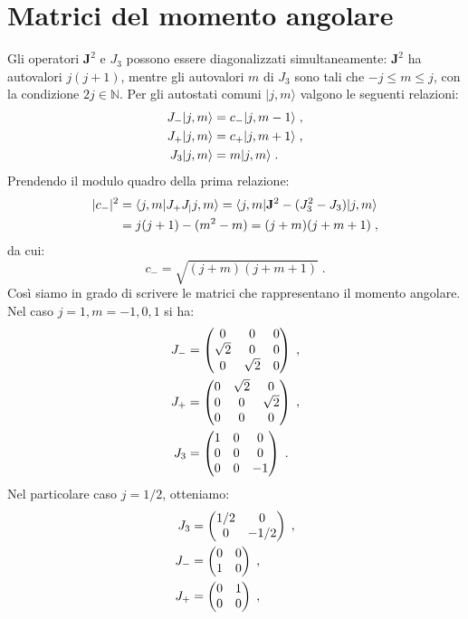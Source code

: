 \documentclass[10pt,a4paper]{report}
\theoremstyle{definition}
\numberwithin{equation}{section}
\newcommand{\bra}{\langle}
\newcommand{\ket}{\rangle}
\begin{document}
\section{Matrici del momento angolare}
Gli operatori $\mathbf{J}^2$ e $J_3$ possono essere diagonalizzati simultaneamente: $\mathbf{J}^2$ ha autovalori $j(j+1)$, mentre gli autovalori $m$ di $J_3$ sono tali che $-j\le m\le j$, con la condizione $2j\in \mathbb{N}$. Per gli autostati comuni $|j,m\ket$ valgono le seguenti relazioni:
\begin{align}
J_-|j,m\ket&=c_-|j,m-1\ket \notag\;, \\
J_+|j,m\ket &= c_+|j,m+1\ket \notag\;, \\
J_3|j,m\ket &= m|j,m\ket\;.
\end{align}
Prendendo il modulo quadro della prima relazione:
\begin{align}
|c_-|^2 &= \bra j,m|J_+J_|j,m\ket = \bra j,m|\mathbf{J}^2-(J_3^2-J_3)|j,m\ket \notag \\
&= j(j+1)-(m^2-m)=(j+m)(j+m+1)\;,
\end{align}
da cui:
\begin{equation}
c_-=\sqrt{(j+m)(j+m+1)}\;.
\end{equation}
Così siamo in grado di scrivere le matrici che rappresentano il momento angolare. Nel caso $j=1, m=-1,0,1$ si ha:
\begin{align}
J_- &=\left(\begin{matrix}
0 & 0 & 0 \\
\sqrt{2} & 0 & 0 \\
0 & \sqrt{2} & 0
\end{matrix}\right)\;, \notag \\
J_+ &=\left(\begin{matrix}
0 & \sqrt{2} & 0 \\
0 & 0 & \sqrt{2} \\
0 & 0 & 0
\end{matrix}\right)\;, \notag \\
J_3 &= \left(\begin{matrix}
1 & 0 & 0 \\
0 & 0 & 0 \\
0 & 0 & -1
\end{matrix}\right)\;.
\end{align}
Nel particolare caso $j=1/2$, otteniamo:
\begin{align}
J_3 &= \left(\begin{matrix}
1/2 & 0 \\
0 & -1/2
\end{matrix}\right)\;, \notag \\
J_-&= \left(\begin{matrix}
0 & 0 \\
1 & 0
\end{matrix}\right)\;, \notag \\
J_+ &= \left(\begin{matrix}
0 & 1 \\
0 & 0
\end{matrix}\right)\;,
\end{align}
\end{document}
